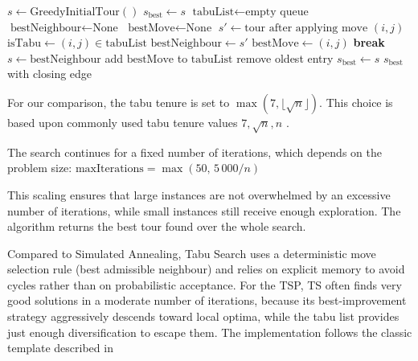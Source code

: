 \begin{algorithm}[H]
	\caption{Tabu Search}
	\label{alg:tabu}
	\begin{algorithmic}[1]
		\STATE $s \gets \text{GreedyInitialTour}()$
		\STATE $s_{\text{best}} \gets s$
		\STATE $\text{tabuList} \gets \text{empty queue}$
		\STATE $\text{bestNeighbour} \gets \text{None}$
		\STATE $\text{bestMove} \gets \text{None}$
		\STATE $s' \gets \text{tour after applying move }(i,j)$
		\STATE $\text{isTabu} \gets (i,j) \in \text{tabuList}$
		\STATE $\text{bestNeighbour} \gets s'$
		\STATE $\text{bestMove} \gets (i,j)$
		\ENDIF
		\ENDIF
		\ENDFOR
		 \STATE \textbf{break} \ENDIF
		\STATE $s \gets \text{bestNeighbour}$
		\STATE add $\text{bestMove}$ to $\text{tabuList}$
		\STATE remove oldest entry
		\ENDIF
		\STATE $s_{\text{best}} \gets s$
		\ENDIF
		\ENDFOR
		\RETURN $s_{\text{best}}$ with closing edge
	\end{algorithmic}
\end{algorithm}
For our comparison, the tabu tenure is set to $\max(7, \lfloor\sqrt{n}\rfloor)$.
This choice is based upon commonly used tabu tenure values \( 7, \sqrt{n},n \) \cite{krishnakumarriyerTabuSearchAlgorithm2013, osmanMetastrategySimulatedAnnealing1993}.

The search continues for a fixed number of iterations, which depends on the problem size: $\text{maxIterations} = \max(50,\, 5\,000 / n)$

This scaling ensures that large instances are not overwhelmed by an excessive number of iterations, while small instances still receive enough exploration.
The algorithm returns the best tour found over the whole search.

Compared to Simulated Annealing, Tabu Search uses a deterministic move selection rule (best admissible neighbour)
and relies on explicit memory to avoid cycles rather than on probabilistic acceptance.
For the TSP, TS often finds very good solutions in a moderate number of iterations,
because its best-improvement strategy aggressively descends toward local optima,
while the tabu list provides just enough diversification to escape them.
The implementation follows the classic template described in \cite{burkeSearchMethodologiesIntroductory2014}






